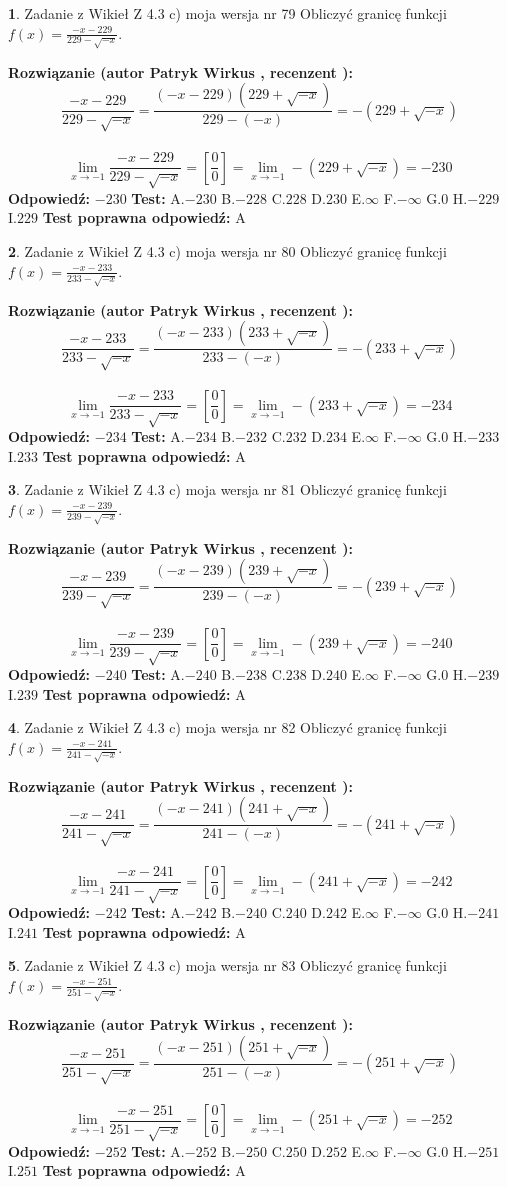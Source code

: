 \documentclass[12pt, a4paper]{article}
\theoremstyle{definition} %
\newtheorem{zad}{}
\newcommand{\zadStart}[1]{\begin{zad}#1\newline}
\newcommand{\zadStop}{\end{zad}}
\newcommand{\rozwStart}[2]{\noindent \textbf{Rozwiązanie (autor #1 , recenzent #2): }\newline}
\newcommand{\rozwStop}{\newline}
\newcommand{\odpStart}{\noindent \textbf{Odpowiedź:}\newline}
\newcommand{\odpStop}{\newline}
\newcommand{\testStart}{\noindent \textbf{Test:}\newline}
\newcommand{\testStop}{\newline}
\newcommand{\kluczStart}{\noindent \textbf{Test poprawna odpowiedź:}\newline}
\newcommand{\kluczStop}{\newline}
\begin{document}
\zadStart{Zadanie z Wikieł Z 4.3 c) moja wersja nr 79}
Obliczyć granicę funkcji $f(x)=\frac{-x-229}{229-\sqrt{-x}}$.
\zadStop
\rozwStart{Patryk Wirkus}{}
$$\frac{-x-229}{229-\sqrt{-x}}=\frac{(-x-229)(229+\sqrt{-x})}{229-(-x)}=-(229+\sqrt{-x})$$
\\
$$\lim\limits_{x\to-1}\frac{-x-229}{229-\sqrt{-x}}=[\frac{0}{0}]=\lim\limits_{x\to-1}-(229+\sqrt{-x}) =-230$$
\rozwStop
\odpStart
$-230$
\odpStop
\testStart
A.$-230$
B.$-228$
C.$228$
D.$230$
E.$\infty$
F.$-\infty$
G.$0$
H.$-229$
I.$229$
\testStop
\kluczStart
A
\kluczStop



\zadStart{Zadanie z Wikieł Z 4.3 c) moja wersja nr 80}
Obliczyć granicę funkcji $f(x)=\frac{-x-233}{233-\sqrt{-x}}$.
\zadStop
\rozwStart{Patryk Wirkus}{}
$$\frac{-x-233}{233-\sqrt{-x}}=\frac{(-x-233)(233+\sqrt{-x})}{233-(-x)}=-(233+\sqrt{-x})$$
\\
$$\lim\limits_{x\to-1}\frac{-x-233}{233-\sqrt{-x}}=[\frac{0}{0}]=\lim\limits_{x\to-1}-(233+\sqrt{-x}) =-234$$
\rozwStop
\odpStart
$-234$
\odpStop
\testStart
A.$-234$
B.$-232$
C.$232$
D.$234$
E.$\infty$
F.$-\infty$
G.$0$
H.$-233$
I.$233$
\testStop
\kluczStart
A
\kluczStop



\zadStart{Zadanie z Wikieł Z 4.3 c) moja wersja nr 81}
Obliczyć granicę funkcji $f(x)=\frac{-x-239}{239-\sqrt{-x}}$.
\zadStop
\rozwStart{Patryk Wirkus}{}
$$\frac{-x-239}{239-\sqrt{-x}}=\frac{(-x-239)(239+\sqrt{-x})}{239-(-x)}=-(239+\sqrt{-x})$$
\\
$$\lim\limits_{x\to-1}\frac{-x-239}{239-\sqrt{-x}}=[\frac{0}{0}]=\lim\limits_{x\to-1}-(239+\sqrt{-x}) =-240$$
\rozwStop
\odpStart
$-240$
\odpStop
\testStart
A.$-240$
B.$-238$
C.$238$
D.$240$
E.$\infty$
F.$-\infty$
G.$0$
H.$-239$
I.$239$
\testStop
\kluczStart
A
\kluczStop



\zadStart{Zadanie z Wikieł Z 4.3 c) moja wersja nr 82}
Obliczyć granicę funkcji $f(x)=\frac{-x-241}{241-\sqrt{-x}}$.
\zadStop
\rozwStart{Patryk Wirkus}{}
$$\frac{-x-241}{241-\sqrt{-x}}=\frac{(-x-241)(241+\sqrt{-x})}{241-(-x)}=-(241+\sqrt{-x})$$
\\
$$\lim\limits_{x\to-1}\frac{-x-241}{241-\sqrt{-x}}=[\frac{0}{0}]=\lim\limits_{x\to-1}-(241+\sqrt{-x}) =-242$$
\rozwStop
\odpStart
$-242$
\odpStop
\testStart
A.$-242$
B.$-240$
C.$240$
D.$242$
E.$\infty$
F.$-\infty$
G.$0$
H.$-241$
I.$241$
\testStop
\kluczStart
A
\kluczStop



\zadStart{Zadanie z Wikieł Z 4.3 c) moja wersja nr 83}
Obliczyć granicę funkcji $f(x)=\frac{-x-251}{251-\sqrt{-x}}$.
\zadStop
\rozwStart{Patryk Wirkus}{}
$$\frac{-x-251}{251-\sqrt{-x}}=\frac{(-x-251)(251+\sqrt{-x})}{251-(-x)}=-(251+\sqrt{-x})$$
\\
$$\lim\limits_{x\to-1}\frac{-x-251}{251-\sqrt{-x}}=[\frac{0}{0}]=\lim\limits_{x\to-1}-(251+\sqrt{-x}) =-252$$
\rozwStop
\odpStart
$-252$
\odpStop
\testStart
A.$-252$
B.$-250$
C.$250$
D.$252$
E.$\infty$
F.$-\infty$
G.$0$
H.$-251$
I.$251$
\testStop
\kluczStart
A
\kluczStop
\end{document}

